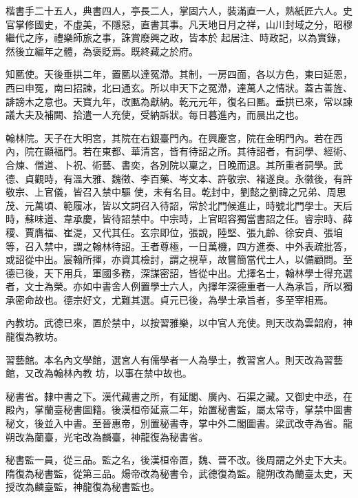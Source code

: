 \begin{pinyinscope}
 楷書手二十五人，典書四人，亭長二人，掌固六人，裝滿直一人，熟紙匠六人。史官掌修國史，不虛美，不隱惡，直書其事。凡天地日月之祥，山川封域之分，昭穆繼代之序，禮樂師旅之事，誅賞廢興之政，皆本於
 起居注、時政記，以為實錄，然後立編年之體，為褒貶焉。既終藏之於府。



 知匭使。天後垂拱二年，置匭以達冤滯。其制，一房四面，各以方色，東曰延恩，西曰申冤，南曰招諫，北曰通玄。所以申天下之冤滯，達萬人之情狀。蓋古善旌、誹謗木之意也。天寶九年，改匭為獻納。乾元元年，復名曰匭。垂拱已來，常以諫議大夫及補闕、拾遣一人充使，受納訴狀。每日暮進內，而晨出之也。



 翰林院。天子在大明宮，其院在右銀臺門內。在興慶宮，院在金明門內。若在西內，院在顯福門。若在東都、華清宮，皆有待詔之所。其待詔者，有詞學、經術、合煉、僧道、卜祝、術藝、書奕，各別院以稟之，日晚而退。其所重者詞學。武德、貞觀時，有溫大雅、魏徵、李百藥、岑文本、許敬宗、褚遂良。永徽後，有許敬宗、上官儀，皆召入禁中驅
 使，未有名目。乾封中，劉懿之劉禕之兄弟、周思茂、元萬頃、範履冰，皆以文詞召入待詔，常於北門候進止，時號北門學士。天后時，蘇味道、韋承慶，皆待詔禁中。中宗時，上官昭容獨當書詔之任。睿宗時、薛稷、賈膺福、崔湜，又代其任。玄宗即位，張說，陸堅、張九齡、徐安貞、張垍等，召入禁中，謂之翰林待詔。王者尊極，一日萬機，四方進奏、中外表疏批答，或詔從中出。宸翰所揮，亦資其檢討，謂之視草，故嘗簡當代士人，以備顧問。至德已後，天下用兵，軍國多務，深謀密詔，皆從中出。尤擇名士，翰林學士得充選者，文士為榮。亦如中書舍人例置學士六人，內擇年深德重者一人為承旨，所以獨承密命故也。德宗好文，尤難其選。貞元已後，為學士承旨者，多至宰相焉。



 內教坊。武德已來，置於禁中，以按習雅樂，以中官人充使。則天改為雲韶府，神龍復為教坊。



 習藝館。本名內文學館，選宮人有儒學者一人為學士，教習宮人。則天改為習藝館，又改為翰林內教
 坊，以事在禁中故也。



 秘書省。隸中書之下。漢代藏書之所，有延閣、廣內、石渠之藏。又御史中丞，在殿內，掌蘭臺秘書圖籍。後漢桓帝延熹二年，始置秘書監，屬太常寺，掌禁中圖書秘文，後並入中書。至晉惠帝，別置秘書寺，掌中外二閣圖書。梁武改寺為省。龍朔改為蘭臺，光宅改為麟臺，神龍復為秘書省。



 秘書監一員，從三品。監之名，後漢桓帝置，魏、晉不改。後周謂之外史下大夫。隋復為秘書監，從第三品。煬帝改為秘書令，武德復為監。龍朔改為蘭臺太史，天授改為麟臺監，神龍復為秘書監也。




\end{pinyinscope}
